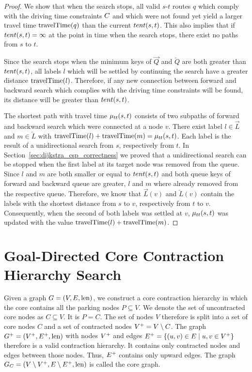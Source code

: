 \begin{proof}
	We show that when the search stops, all valid $s$-$t$ routes $q$ which comply with the driving time constraints $C$ and which were not found yet yield a larger travel time $\operatorname{travelTime}(q)$ than the current $tent(s,t)$. This also implies that if $tent(s,t) = \infty$ at the point in time when the search stops, there exist no paths from $s$ to $t$.

	Since the search stops when the minimum keys of $\overrightarrow{Q}$ and $\overleftarrow{Q}$ are both greater than $tent(s,t)$, all labels $l$ which will be settled by continuing the search have a greater distance $\operatorname{travelTime}(l)$. Therefore, if any new connection between forward and backward search which complies with the driving time constraints will be found, its distance will be greater than $tent(s,t)$.

	The shortest path with travel time $\mu_{tt}(s,t)$ consists of two subpaths of forward and backward search which were connected at a node $v$. There exist label $l \in \overrightarrow{L}$ and $m \in \overleftarrow{L}$ with $\operatorname{travelTime}(l) + \operatorname{travelTime}(m) = \mu_{tt}(s,t)$. Each label is the result of a unidirectional search from $s$, respectively from $t$. In Section~\ref{sec:dijkstra_csp_correctness} we proved that a unidirectional search can be stopped when the first label at its target node was removed from the queue. Since $l$ and $m$ are both smaller or equal to $tent(s,t)$ and both queue keys of forward and backward queue are greater, $l$ and $m$ where already removed from the respective queue. Therefore, we know that $\overrightarrow{L}(v)$ and $\overleftarrow{L}(v)$ contain the labels with the shortest distance from $s$ to $v$, respectively from $t$ to $v$. Consequently, when the second of both labels was settled at $v$, $\mu_{tt}(s,t)$ was updated with the value $\operatorname{travelTime}(l) + \operatorname{travelTime}(m)$.
\end{proof}

\section{Goal-Directed Core Contraction Hierarchy Search\label{sec:astar_corech}}
Given a graph $G = (V,E,\operatorname{len})$, we construct a core contraction hierarchy in which the core contains all the parking nodes $P \subseteq V$. We denote the set of uncontracted core nodes as $C \subseteq V$. It is $P = C$. The set of nodes $V$ therefore is split into a set of core nodes $C$ and a set of contracted nodes $V^+ = V \setminus C$. The graph $G^+ = (V^+,E^+,\operatorname{len})$ with nodes $V^+$ and edges $E^+ = \{(u,v) \in E \mid u,v \in V^+\}$ therefore is a valid contraction hierarchy. It contains only contracted nodes and edges between those nodes. Thus, $E^+$ contains only upward edges. The graph $G_{C} = (V \setminus V^+,E \setminus E^+,\operatorname{len})$ is called the core graph.

